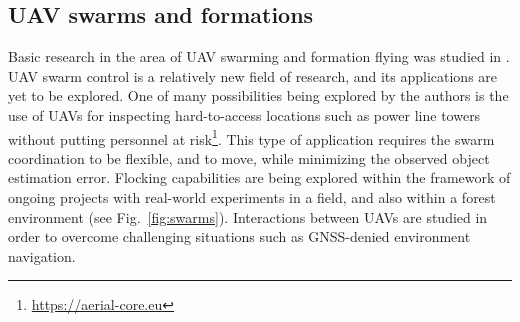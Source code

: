 \documentclass[a4paper,11pt,titlepage,twoside]{book}
\newcommand{\reffig}[1]{Fig.~\ref{#1}}
\begin{document}
  \subsection{UAV swarms and formations}
  \label{sec:uav_swarms_and_formations}

  Basic research in the area of \ac{UAV} swarming and formation flying was studied in \cite{saska2020formation, saska2016formations, saska2019large}.
  \ac{UAV} swarm control is a relatively new field of research, and its applications are yet to be explored.
  One of many possibilities being explored by the authors is the use of \acp{UAV} for inspecting hard-to-access locations such as power line towers without putting personnel at risk\footnote{\url{https://aerial-core.eu}}.
  This type of application requires the swarm coordination to be flexible, and to move, while minimizing the observed object estimation error.
  Flocking capabilities are being explored within the framework of ongoing projects with real-world experiments in a field, and also within a forest environment (see \reffig{fig:swarms}).
  Interactions between \acp{UAV} are studied in order to overcome challenging situations such as GNSS-denied environment navigation.
\end{document}
